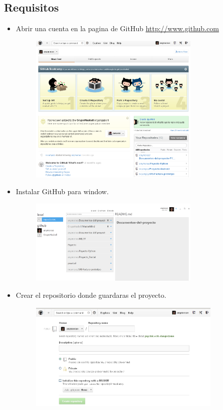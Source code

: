     \subsection{ Requisitos}
\begin{itemize}
\item  Abrir una cuenta en la pagina de GitHub
 \url{  http://www.github.com}
       \begin{figure}[htb]
\centering
\includegraphics[width=0.77\textwidth]{./imagenes1/Dibujo1.png}
\end{figure}

 \item Instalar GitHub para window.
      \begin{figure}[htb]
\centering
\includegraphics[width=0.77\textwidth]{./imagenes1/Dibujo2.png}
\end{figure}

 \item Crear el repositorio donde guardaras el proyecto.
     \begin{figure}[htb]
\centering
\includegraphics[width=0.87\textwidth]{./imagenes1/Dibujo3.png}
\end{figure}

\end{itemize}


